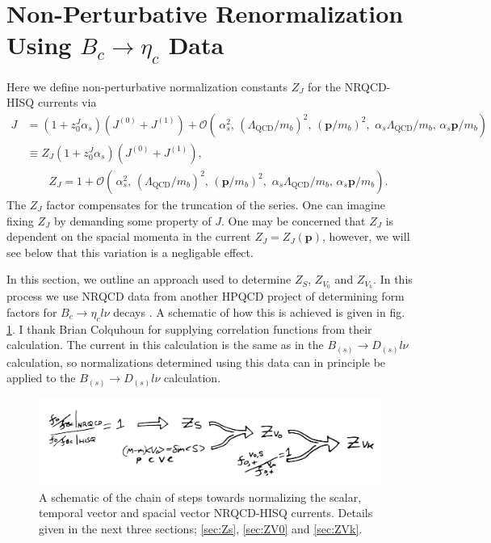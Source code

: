 \section{Non-Perturbative Renormalization Using $B_c\to \eta_c$ Data}
\label{sec:Bcetac}

Here we define non-perturbative normalization constants $Z_J$ for the NRQCD-HISQ currents via 
\begin{align}
  \nonumber
	J &= ( 1 + z^J_0 \alpha_s )( J^{(0)} + J^{(1)} ) + \mathcal{O}(\, \alpha_s^2, \, (\Lambda_{\text{QCD}}/m_b)^2, \, ({\textbf{p}}/m_b)^2,\,\,\alpha_s \Lambda_{\text{QCD}} / m_b,\, \alpha_s {\textbf{p}}/m_b ) \\ \nonumber
	&\equiv Z_{J}( 1 + z^J_0 \alpha_s )( J^{(0)} + J^{(1)} ), \\  &\quad\quad Z_{J} = 1 +  \mathcal{O}(\, \alpha_s^2, \, (\Lambda_{\text{QCD}}/m_b)^2, \, ({\textbf{p}}/m_b)^2,\,\,\alpha_s \Lambda_{\text{QCD}} / m_b,\, \alpha_s {\textbf{p}}/m_b ).
	\label{eq:overall}
\end{align}
The $Z_J$ factor compensates for the truncation of the series. One can imagine fixing $Z_J$ by demanding some property of $J$. One may be concerned that $Z_J$ is dependent on the spacial momenta in the current $Z_J=Z_J({\textbf{p}})$, however, we will see below that this variation is a negligable effect.

In this section, we outline an approach used to determine $Z_S$, $Z_{V_0}$ and $Z_{V_k}$. In this process we use NRQCD data from another HPQCD project of determining form factors for $B_c \to \eta_c l\nu$ decays \cite{Colquhoun:2016osw}. A schematic of how this is achieved is given in fig. \ref{fig:normalization_chain}. I thank Brian Colquhoun for supplying correlation functions from their calculation. The current in this calculation is the same as in the $B_{(s)}\to D_{(s)}l\nu$ calculation, so normalizations determined using this data can in principle be applied to the $B_{(s)}\to D_{(s)}l\nu$ calculation.

\begin{figure}[htb!]
\hspace{-5pt}
    \includegraphics[width=1.0\textwidth]{images/nrqcd/normalization_chain.jpg}
  \caption{A schematic of the chain of steps towards normalizing the scalar, temporal vector and spacial vector NRQCD-HISQ currents. Details given in the next three sections; \ref{sec:Zs}, \ref{sec:ZV0} and \ref{sec:ZVk}. \label{fig:normalization_chain}}
\end{figure}

